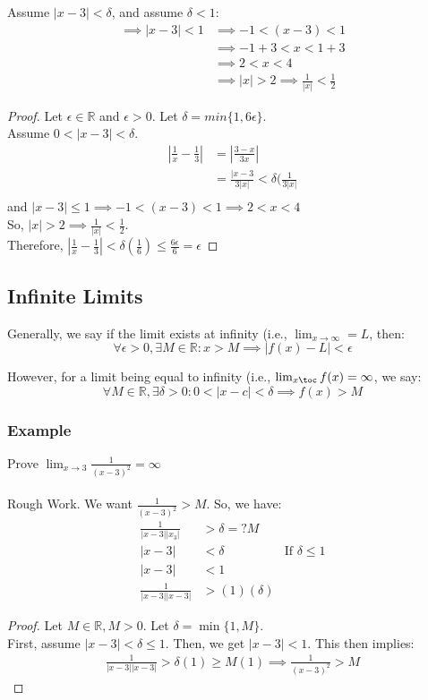 \documentclass{article}
\begin{document}
Assume $| x - 3 | < \delta$, and assume $\delta < 1$:
\begin{align*}
\implies | x - 3 | < 1 & \implies -1 < (x - 3) < 1 \\
& \implies -1 + 3 < x < 1 + 3\\
& \implies 2 < x < 4\\
& \implies | x | > 2 \implies \frac{1}{| x |} < \frac{1}{2}
\end{align*}
\begin{proof}
Let $\epsilon \in \mathbb{R}$ and $\epsilon > 0$. Let $\delta = min\{1, 6\epsilon\}$.\\
Assume $0 < | x - 3 | < \delta$.
\begin{align*}
    | \frac{1}{x} - \frac{1}{3} | & = | \frac{3 - x}{3x} |\\
    & = \frac{| x - 3}{3| x|} < \delta(\frac{1}{3| x |}\\
\end{align*}
and $| x - 3 | \leq 1 \implies -1 < (x -3) < 1 \implies 2 < x < 4$\\
So, $| x | > 2 \implies \frac{1}{| x |} < \frac{1}{2}$.\\
Therefore, $| \frac{1}{x} - \frac{1}{3} | < \delta(\frac{1}{6}) \leq \frac{6\epsilon}{6} = \epsilon$
\end{proof}

\subsection{Infinite Limits}
Generally, we say if the limit exists at infinity (i.e., $\lim_{x\to\infty} = L$, then: 
$$\forall \epsilon > 0, \exists M \in \mathbb{R} : x > M \implies |f(x) - L| < \epsilon$$

However, for a limit being equal to infinity (i.e., $\lim_{x\toc}f(x) = \infty$, we say:
$$\forall M \in \mathbb{R}, \exists \delta > 0 : 0 < | x-c | < \delta \implies f(x) > M$$
\subsubsection{Example}
Prove $\lim_{x\to3} \frac{1}{(x-3)^2} = \infty$\\
\\
Rough Work. We want $\frac{1}{(x-3)^2} > M$. So, we have:
\begin{align*}
    \frac{1}{|x-3||x_3|} & > \delta =? M\\
    |x-3| & < \delta & \text{If }\delta \leq 1\\
    |x-3| & < 1\\
    \frac{1}{|x-3||x-3|} & > (1)(\delta)
\end{align*}
\begin{proof}
    Let $M \in \mathbb{R}, M > 0$. Let $\delta = \min\{1, M\}$.\\
    First, assume $|x-3| < \delta \leq 1$. Then, we get $|x-3| < 1$. This then implies:
    \begin{align*}
        \frac{1}{|x-3||x-3|} > \delta(1) \geq M(1) \implies \frac{1}{(x-3)^2} > M
    \end{align*}
\end{proof}
\end{document}
